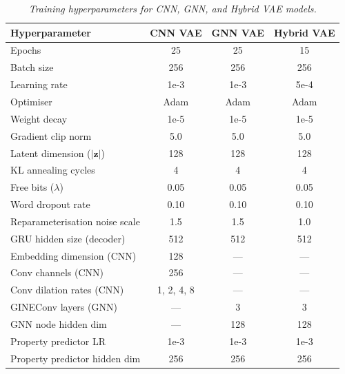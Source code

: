 \documentclass[12pt,a4paper]{report}
\begin{document}
\begin{table}[htbp]
\centering
\caption{\textit{Training hyperparameters for CNN, GNN, and Hybrid VAE models.}}
\label{tab:hyperparams}
\renewcommand{\arraystretch}{1.1}
\begin{tabular}{lccc}
\hline
\textbf{Hyperparameter}        & \textbf{CNN VAE} & \textbf{GNN VAE} & \textbf{Hybrid VAE} \\
\hline
Epochs                         & 25               & 25               & 15 \\
Batch size                     & 256              & 256              & 256 \\
Learning rate                  & 1e-3             & 1e-3             & 5e-4 \\
Optimiser                      & Adam             & Adam             & Adam \\
Weight decay                   & 1e-5             & 1e-5             & 1e-5 \\
Gradient clip norm             & 5.0              & 5.0              & 5.0 \\
Latent dimension ($|\mathbf{z}|$) & 128           & 128              & 128 \\
KL annealing cycles            & 4                & 4                & 4 \\
Free bits ($\lambda$)          & 0.05             & 0.05             & 0.05 \\
Word dropout rate              & 0.10             & 0.10             & 0.10 \\
Reparameterisation noise scale & 1.5              & 1.5              & 1.0 \\
GRU hidden size (decoder)      & 512              & 512              & 512 \\
Embedding dimension (CNN)      & 128              & —                & — \\
Conv channels (CNN)            & 256              & —                & — \\
Conv dilation rates (CNN)      & 1, 2, 4, 8       & —                & — \\
GINEConv layers (GNN)          & —                & 3                & 3 \\
GNN node hidden dim            & —                & 128              & 128 \\
Property predictor LR          & 1e-3             & 1e-3             & 1e-3 \\
Property predictor hidden dim  & 256              & 256              & 256 \\
\hline
\end{tabular}
\end{table}
\end{document}
